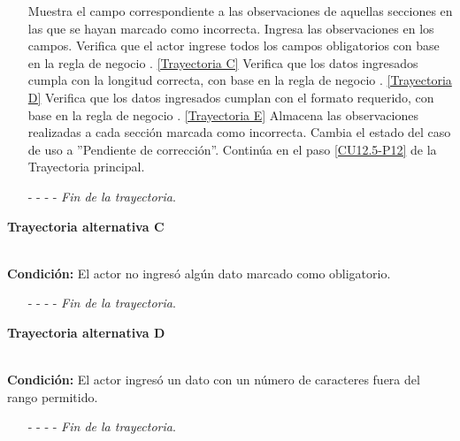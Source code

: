 \begin{enumerate}
	\UCpaso[\UCsist] Muestra el campo correspondiente a las observaciones de aquellas secciones en las que se hayan marcado como incorrecta.
	\UCpaso[\UCactor] Ingresa las observaciones en los campos. \label{CU12.5-TAP2}
	\UCpaso[\UCsist] Verifica que el actor ingrese todos los campos obligatorios con base en la regla de negocio . \hyperlink{CU12-5:TAC}{[Trayectoria C]}
	\UCpaso[\UCsist] Verifica que los datos ingresados cumpla con la longitud correcta, con base en la regla de negocio . \hyperlink{CU12-5:TAD}{[Trayectoria D]}
	\UCpaso[\UCsist] Verifica que los datos ingresados cumplan con el formato requerido, con base en la regla de negocio . \hyperlink{CU12-5:TAE}{[Trayectoria E]}
	\UCpaso[\UCsist] Almacena las observaciones realizadas a cada sección marcada como incorrecta.
	\UCpaso[\UCsist] Cambia el estado del caso de uso a ''Pendiente de corrección''.
	\UCpaso  Continúa en el paso \ref{CU12.5-P12} de la Trayectoria principal.
	\item[- -] - - {\em {Fin de la trayectoria}}.%
\end{enumerate}
\hypertarget{CU12-5:TAC}{\textbf{Trayectoria alternativa C}}\\
\noindent \textbf{Condición:} El actor no ingresó algún dato marcado como obligatorio.
\begin{enumerate}
	\UCpaso[\UCsist] Muestra el mensaje  señalando el campo que presenta el error en la pantalla .
	\UCpaso Regresa al paso \ref{CU12.5-P5} de la Trayectoria principal o al paso \ref{CU12.5-TAP2} de la Trayectoria alternativa B.
	\item[- -] - - {\em {Fin de la trayectoria}}.%
\end{enumerate}
\hypertarget{CU12-5:TAD}{\textbf{Trayectoria alternativa D}}\\
\noindent \textbf{Condición:} El actor ingresó un dato con un número de caracteres fuera del rango permitido.
\begin{enumerate}
	\UCpaso[\UCsist] Muestra el mensaje  señalando el campo que presenta el error en la pantalla .
	\UCpaso Regresa al paso \ref{CU12.5-P5} de la Trayectoria principal o al paso \ref{CU12.5-TAP2} de la Trayectoria alternativa B.
	\item[- -] - - {\em {Fin de la trayectoria}}.%
\end{enumerate}
